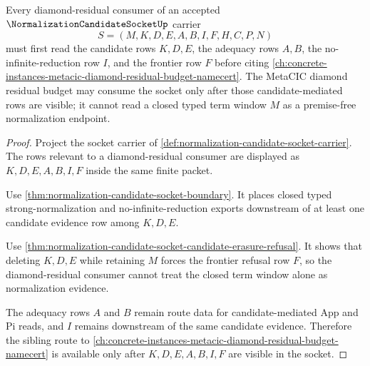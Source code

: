 \begin{theorem}
\label{thm:normalization-candidate-socket-metacic-diamond-route}
Every diamond-residual consumer of an accepted $\NormalizationCandidateSocketUp$ carrier
$$
S=(M,K,D,E,A,B,I,F,H,C,P,N)
$$
must first read the candidate rows $K,D,E$, the adequacy rows $A,B$, the no-infinite-reduction row $I$, and the frontier row $F$ before citing \autoref{ch:concrete-instances-metacic-diamond-residual-budget-namecert}. The MetaCIC diamond residual budget may consume the socket only after those candidate-mediated rows are visible; it cannot read a closed typed term window $M$ as a premise-free normalization endpoint.
\end{theorem}
\begin{proof}
Project the socket carrier of \autoref{def:normalization-candidate-socket-carrier}. The rows relevant to a diamond-residual consumer are displayed as $K,D,E,A,B,I,F$ inside the same finite packet.

Use \autoref{thm:normalization-candidate-socket-boundary}. It places closed typed strong-normalization and no-infinite-reduction exports downstream of at least one candidate evidence row among $K,D,E$.

Use \autoref{thm:normalization-candidate-socket-candidate-erasure-refusal}. It shows that deleting $K,D,E$ while retaining $M$ forces the frontier refusal row $F$, so the diamond-residual consumer cannot treat the closed term window alone as normalization evidence.

The adequacy rows $A$ and $B$ remain route data for candidate-mediated App and Pi reads, and $I$ remains downstream of the same candidate evidence. Therefore the sibling route to \autoref{ch:concrete-instances-metacic-diamond-residual-budget-namecert} is available only after $K,D,E,A,B,I,F$ are visible in the socket.
\end{proof}

